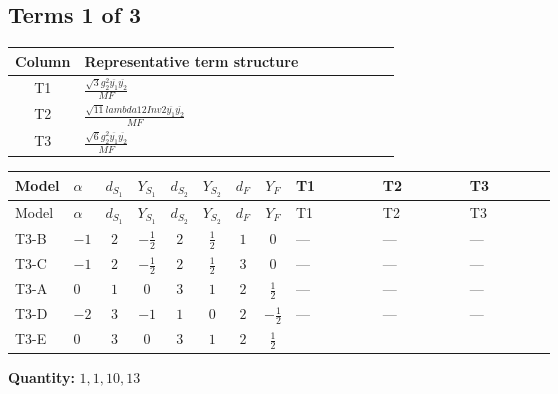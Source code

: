 \documentclass[8pt]{article}
\begin{document}
\begin{landscape}
\subsection*{Terms 1 of 3}
\begin{center}
\begin{tabular}{@{}c >{\raggedright\arraybackslash}p{0.82\linewidth}@{}}
\toprule
Column & Representative term structure \\
\midrule
T1 & \(\displaystyle \frac{\sqrt{3} g_{2}^{2} \overline{y_{1}} \overline{y_{2}}}{MF}\) \\
\midrule
T2 & \(\displaystyle \frac{\sqrt{11} lambda12Inv2 \overline{y_{1}} \overline{y_{2}}}{MF}\) \\
\midrule
T3 & \(\displaystyle \frac{\sqrt{6} g_{2}^{2} \overline{y_{1}} \overline{y_{2}}}{MF}\) \\
\midrule
\bottomrule
\end{tabular}
\end{center}
\smallskip
\tiny
\begin{longtable}{@{}llcccccc >{\raggedright\arraybackslash}p{0.21\linewidth} >{\raggedright\arraybackslash}p{0.21\linewidth} >{\raggedright\arraybackslash}p{0.21\linewidth}@{}}
\toprule
Model & $\alpha$ & $d_{S_1}$ & $Y_{S_1}$ & $d_{S_2}$ & $Y_{S_2}$ & $d_F$ & $Y_F$ & T1 & T2 & T3 \\
\midrule
\endfirsthead
\toprule
Model & $\alpha$ & $d_{S_1}$ & $Y_{S_1}$ & $d_{S_2}$ & $Y_{S_2}$ & $d_F$ & $Y_F$ & T1 & T2 & T3 \\
\midrule
\endhead
T3-B & $-1$ & $2$ & $-\frac{1}{2}$ & $2$ & $\frac{1}{2}$ & $1$ & $0$ & --- & --- & --- \\
\midrule
T3-C & $-1$ & $2$ & $-\frac{1}{2}$ & $2$ & $\frac{1}{2}$ & $3$ & $0$ & --- & --- & --- \\
\midrule
T3-A & $0$ & $1$ & $0$ & $3$ & $1$ & $2$ & $\frac{1}{2}$ & --- & --- & --- \\
\midrule
T3-D & $-2$ & $3$ & $-1$ & $1$ & $0$ & $2$ & $-\frac{1}{2}$ & --- & --- & --- \\
\midrule
T3-E & $0$ & $3$ & $0$ & $3$ & $1$ & $2$ & $\frac{1}{2}$ & \scriptsize\adjustbox{max width=\linewidth}{$\begin{gathered} - \frac{49 \sqrt{3} g_{2}^{2} \overline{y_{1}} \overline{y_{2}}}{24 MF}\end{gathered}$} & \scriptsize\adjustbox{max width=\linewidth}{$\begin{gathered} - \frac{3 \sqrt{11} lambda12Inv2 \overline{y_{1}} \overline{y_{2}}}{22 MF}\end{gathered}$} & \scriptsize\adjustbox{max width=\linewidth}{$\begin{gathered} - \frac{\sqrt{6} g_{2}^{2} \overline{y_{1}} \overline{y_{2}}}{3 MF}\end{gathered}$} \\
\midrule
\bottomrule
\end{longtable}
\clearpage
\noindent\textbf{Quantity: }$\mathrm{1,1,10,13}$\par\smallskip

\end{landscape}
\end{document}
